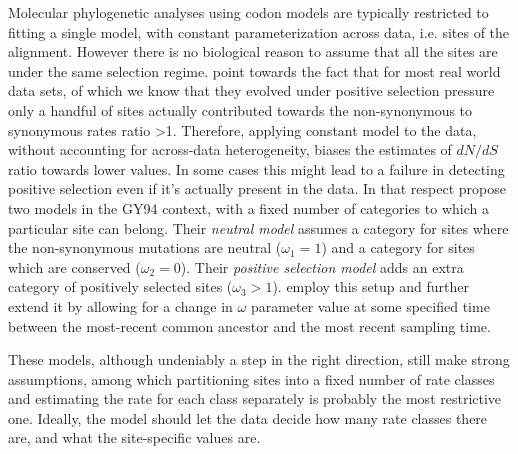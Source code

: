 Molecular phylogenetic analyses using codon models are typically restricted to fitting a single model, with constant parameterization across data, i.e. sites of the alignment.
However there is no biological reason to assume that all the sites are under the same selection regime.
\cite{NY98} point towards the fact that for most real world data sets, of which we know that they evolved under positive selection pressure only a handful of sites actually contributed towards the non-synonymous to synonymous rates ratio >1.
Therefore, applying constant model to the data, without accounting for across-data heterogeneity, biases the estimates of $dN/dS$ ratio towards lower values.
In some cases this might lead to a failure in detecting positive selection even if it's actually present in the data.  
In that respect \cite{NY98} propose two models in the GY94 context, with a fixed number of categories to which a particular site can belong.
Their \emph{neutral model} assumes a category for sites where the non-synonymous mutations are neutral ($\omega_1=1$) and a category for sites which are conserved ($\omega_2=0$).
Their \emph{positive selection model} adds an extra category of positively selected sites ($\omega_3>1$).
\cite{Goode2008} employ this setup and further extend it by allowing for a change in $\omega$ parameter value at some specified time between the most-recent common ancestor and the most recent sampling time.

These models, although undeniably a step in the right direction, still make strong assumptions, among which partitioning sites into a fixed number of rate classes and estimating the rate for each class separately is probably the most restrictive one.
Ideally, the model should let the data decide how many rate classes there are, and what the site-specific values are.

